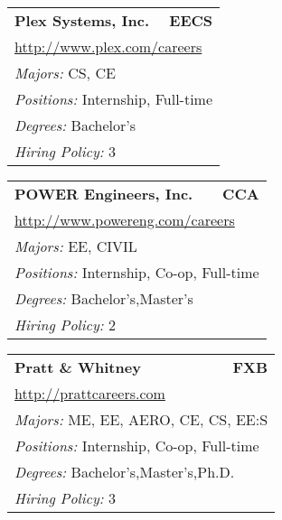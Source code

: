 \documentclass[twoside]{article}
\begin{document}
\begin{center}
\begin{multicols}{3}
\begin{FlushLeft}
\begin{minipage}{\columnwidth}
\end{minipage}
 
\begin{minipage}{\columnwidth}\begin{tabularx}{.95\columnwidth}{Xr}
                 {\Large\bf Plex Systems, Inc.} & {\Large\bf EECS}\\
    \multicolumn{2}{p{.95\columnwidth}}{\url{http://www.plex.com/careers}}\\
    \multicolumn{2}{p{.95\columnwidth}}{\emph{Majors:} CS, CE}\\
    \multicolumn{2}{p{.95\columnwidth}}{\emph{Positions:} Internship, Full-time}\\
    \multicolumn{2}{p{.95\columnwidth}}{\emph{Degrees:} Bachelor's}\\
    \multicolumn{2}{p{.95\columnwidth}}{\emph{Hiring Policy:} 3}\\
    \end{tabularx}
    
\end{minipage}
 
\begin{minipage}{\columnwidth}\begin{tabularx}{.95\columnwidth}{Xr}
                 {\Large\bf POWER Engineers, Inc.} & {\Large\bf CCA}\\
    \multicolumn{2}{p{.95\columnwidth}}{\url{http://www.powereng.com/careers}}\\
    \multicolumn{2}{p{.95\columnwidth}}{\emph{Majors:} EE, CIVIL}\\
    \multicolumn{2}{p{.95\columnwidth}}{\emph{Positions:} Internship, Co-op, Full-time}\\
    \multicolumn{2}{p{.95\columnwidth}}{\emph{Degrees:} Bachelor's,Master's}\\
    \multicolumn{2}{p{.95\columnwidth}}{\emph{Hiring Policy:} 2}\\
    \end{tabularx}
    
\end{minipage}
 
\begin{minipage}{\columnwidth}\begin{tabularx}{.95\columnwidth}{Xr}
                 {\Large\bf Pratt \& Whitney} & {\Large\bf FXB}\\
    \multicolumn{2}{p{.95\columnwidth}}{\url{http://prattcareers.com}}\\
    \multicolumn{2}{p{.95\columnwidth}}{\emph{Majors:} ME, EE, AERO, CE, CS, EE:S}\\
    \multicolumn{2}{p{.95\columnwidth}}{\emph{Positions:} Internship, Co-op, Full-time}\\
    \multicolumn{2}{p{.95\columnwidth}}{\emph{Degrees:} Bachelor's,Master's,Ph.D.}\\
    \multicolumn{2}{p{.95\columnwidth}}{\emph{Hiring Policy:} 3}\\
    \end{tabularx}
    

\end{minipage}
\end{FlushLeft}
\end{multicols}
\end{center}
\end{document}
